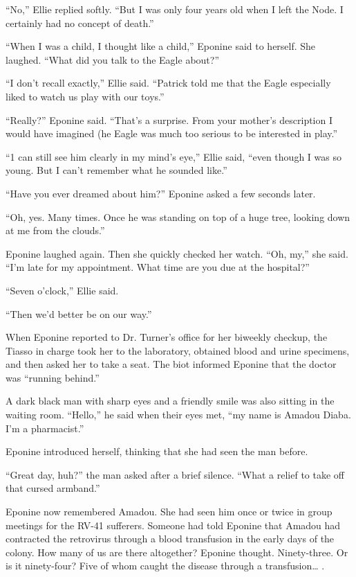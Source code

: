 \documentclass[]{article}
\begin{document}
{“No,” Ellie replied softly. “But I was only four years old when I left the Node. I certainly had no concept of death.”

“When I was a child, I thought like a child,” Eponine said to herself. She laughed. “What did you talk to the Eagle about?”

“I don’t recall exactly,” Ellie said. “Patrick told me that the Eagle especially liked to watch us play with our toys.”

“Really?” Eponine said. “That’s a surprise. From your mother’s description I would have imagined (he Eagle was much too serious to be interested in play.”

“1 can still see him clearly in my mind’s eye,” Ellie said, “even though I was so young. But I can’t remember what he sounded like.”

“Have you ever dreamed about him?” Eponine asked a few seconds later.

“Oh, yes. Many times. Once he was standing on top of a huge tree, looking down at me from the clouds.”

Eponine laughed again. Then she quickly checked her watch. “Oh, my,” she said. “I’m late for my appointment. What time are you due at the hospital?”

“Seven o’clock,” Ellie said.

“Then we’d better be on our way.”

When Eponine reported to Dr. Turner’s office for her biweekly checkup, the Tiasso in charge took her to the laboratory, obtained blood and urine specimens, and then asked her to take a seat. The biot informed Eponine that the doctor was “running behind.”

A dark black man with sharp eyes and a friendly smile was also sitting in the waiting room. “Hello,” he said when their eyes met, “my name is Amadou Diaba. I’m a pharmacist.”

Eponine introduced herself, thinking that she had seen the man before.

“Great day, huh?” the man asked after a brief silence. “What a relief to take off that cursed armband.”

Eponine now remembered Amadou. She had seen him once or twice in group meetings for the RV-41 sufferers. Someone had told Eponine that Amadou had contracted the retrovirus through a blood transfusion in the early days of the colony. How many of us are there altogether? Eponine thought. Ninety-three. Or is it ninety-four? Five of whom caught the disease through a transfusion… .

}
\end{document}
